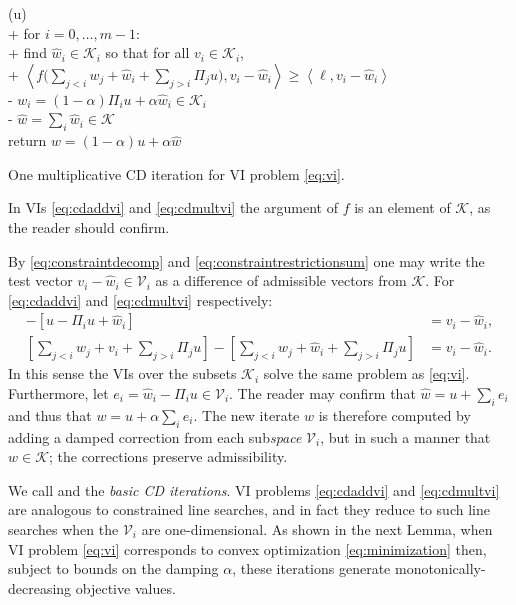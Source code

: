 \documentclass[letterpaper,final,12pt,reqno]{amsart}
\theoremstyle{cstyle}
\theoremstyle{cstyle*}
\theoremstyle{dstyle}
\numberwithin{equation}{section}
\numberwithin{figure}{section}
\numberwithin{table}{section}
\numberwithin{theorem}{section}
\newcommand{\cK}{\mathcal{K}}
\newcommand{\cV}{\mathcal{V}}
\newcommand{\ip}[2]{\left<#1,#2\right>}
\begin{document}
\begin{pseudofloat}[H]
\begin{pseudo*}
(u)\text{:} \\+
    for $i = 0,\dots,m-1$: \\+
        \rm{find} $\hat w_i\in \cK_i$ \rm{so that for all} $v_i\in \cK_i$, \\+
            $\displaystyle \ip{f\Big(\sum_{j<i} w_j + \hat w_i + \sum_{j>i} \Pi_j u\Big)}{v_i-\hat w_i} \ge \ip{\ell}{v_i-\hat w_i}$ \\-
            $w_i = (1-\alpha) \Pi_i u + \alpha \hat w_i\in\cK_i$ \\-
    $\hat w = \sum_i \hat w_i\in\cK$ \\
    return $w=(1-\alpha) u + \alpha \hat w$
\end{pseudo*}
\caption{One multiplicative CD iteration for VI problem \eqref{eq:vi}.}
\label{alg:basiccd-mult}
\end{pseudofloat}

In VIs \eqref{eq:cdaddvi} and \eqref{eq:cdmultvi} the argument of $f$ is an element of $\cK$, as the reader should confirm.

By \eqref{eq:constraintdecomp} and \eqref{eq:constraintrestrictionsum} one may write the test vector $v_i - \hat w_i \in \cV_i$ as a difference of admissible vectors from $\cK$.  For \eqref{eq:cdaddvi} and \eqref{eq:cdmultvi} respectively:
\begin{align}
[u - \Pi_i u + v_i] - [u - \Pi_i u + \hat w_i] &= v_i - \hat w_i, \label{eq:admissibledifferenceadd} \\
\left[\sum_{j<i} w_j + v_i + \sum_{j>i} \Pi_j u\right] - \left[\sum_{j<i} w_j + \hat w_i + \sum_{j>i} \Pi_j u\right] &= v_i - \hat w_i.  \label{eq:admissibledifferencemult}
\end{align}
In this sense the VIs over the subsets $\mathcal{K}_i$ solve the same problem as \eqref{eq:vi}.  Furthermore, let $e_i = \hat w_i - \Pi_i u \in \cV_i$.  The reader may confirm that $\hat w = u + \sum_{i} e_i$ and thus that $w = u + \alpha \sum_i e_i$.  The new iterate $w$ is therefore computed by adding a damped correction from each sub\emph{space} $\mathcal{V}_i$, but in such a manner that $w \in \mathcal{K}$; the corrections preserve admissibility.

We call  and  the \emph{basic CD iterations}.  VI problems \eqref{eq:cdaddvi} and \eqref{eq:cdmultvi} are analogous to constrained line searches, and in fact they reduce to such line searches when the $\cV_i$ are one-dimensional.  As shown in the next Lemma, when VI problem \eqref{eq:vi} corresponds to convex optimization \eqref{eq:minimization} then, subject to bounds on the damping $\alpha$, these iterations generate monotonically-decreasing objective values.
\end{document}
